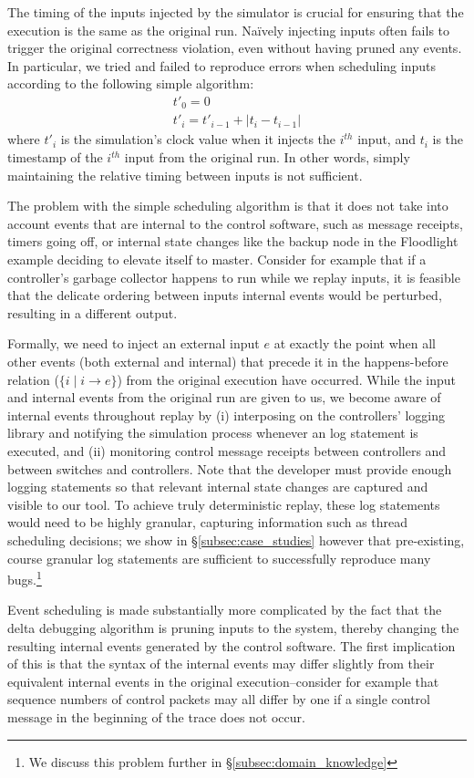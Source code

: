The timing of the inputs injected by the simulator is crucial for ensuring that the
execution is the same as the original run. Na\"ively injecting inputs often fails to
trigger the original correctness violation, even without having pruned any
events. In particular, we tried and failed to reproduce errors when scheduling inputs
according to the following simple algorithm:
\begin{align*}
t'_0 = 0 \\
t'_i = t'_{i-1} + |t_{i} - t_{i-1}|
\end{align*}
where $t'_i$ is the simulation's clock value when it injects the $i^{th}$ input, and $t_i$ is
the timestamp of the $i^{th}$ input from the original run. In other words, simply
maintaining the relative timing between inputs is not sufficient.

The problem with the simple scheduling algorithm is that it does not take into
account events that are internal to the control software, such as
message receipts, timers going off, or internal state
changes like the backup node in the Floodlight example deciding to elevate itself to master.
Consider for example that if a controller's garbage collector happens to run
while we replay inputs, it is feasible that the delicate ordering between
inputs internal events would be perturbed, resulting in a different output.

Formally, we need to inject an external input $e$ at exactly the point when all other
events (both external and internal) that precede it in the happens-before
relation ($\{i \mid i \rightarrow e\}$) from the original execution have occurred.
While the input and internal events from the original run are given to us,
we become aware of internal events throughout replay by
(i) interposing on the controllers' logging library and notifying the
simulation process whenever an log statement is executed, and (ii) monitoring
control message receipts between controllers and between switches and
controllers. Note that the developer must provide enough logging statements
so that relevant internal state changes are captured and visible to our
tool. To achieve truly deterministic replay, these log statements would need to
be highly granular, capturing information such as thread scheduling decisions;
we show in \S\ref{subsec:case_studies}
however that pre-existing, course granular log statements are sufficient to
successfully reproduce many bugs.\footnote{We discuss this problem further in \S\ref{subsec:domain_knowledge}}

Event scheduling is made substantially more complicated by the fact
that the delta debugging algorithm is pruning inputs to the
system, thereby changing the resulting internal events generated by the control
software. The first implication of this is that the syntax of the internal events may differ
slightly from their equivalent internal events in the original
execution--consider for example that sequence numbers of control packets may
all differ by one if a single control message in the beginning of the trace
does not occur.

